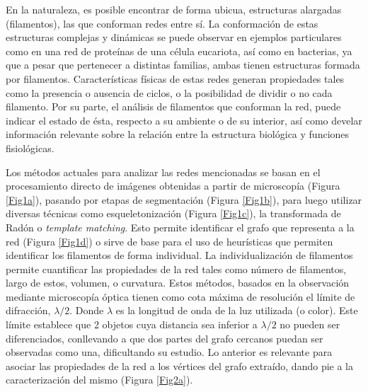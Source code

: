\begin{intro}
\label{intro}

En la naturaleza, es posible encontrar de forma ubicua, estructuras alargadas (filamentos), las que conforman redes entre sí. La conformación de estas estructuras complejas y din\'amicas se puede observar en ejemplos particulares como en una red de prote\'inas de una c\'elula eucariota, as\'i como en bacterias, ya que a pesar que pertenecer a distintas familias, ambas tienen estructuras formada por filamentos. 
Caracter\'isticas f\'isicas de estas redes generan propiedades tales como la presencia o ausencia de ciclos, o la posibilidad de dividir o no cada filamento. Por su parte, el análisis de filamentos que conforman la red, puede indicar el estado de \'esta, respecto a su ambiente o de su interior, as\'i como develar informaci\'on relevante sobre la relaci\'on entre la estructura biol\'ogica y funciones fisiol\'ogicas.  
  
Los m\'etodos actuales para analizar las redes mencionadas se basan en el procesamiento directo de im\'agenes obtenidas a partir de microscop\'ia (Figura \ref{Fig1a}), pasando por etapas de segmentaci\'on (Figura \ref{Fig1b}), para luego utilizar diversas t\'ecnicas como esqueletonizaci\'on (Figura \ref{Fig1c}), la transformada de Rad\'on o {\it template matching}. Esto permite identificar el grafo que representa a la red (Figura \ref{Fig1d}) o sirve de base para el uso de heur\'isticas que permiten identificar los filamentos de forma individual.
La individualizaci\'on de filamentos permite cuantificar las propiedades de la red tales como n\'umero de filamentos, largo de estos, volumen, o curvatura. Estos m\'etodos, basados en la observaci\'on mediante microscop\'ia \'optica tienen como cota m\'axima de resoluci\'on el l\'imite de difracci\'on, $\lambda/2$. Donde $\lambda$ es la longitud de onda de la luz utilizada (o color). Este l\'imite establece que 2 objetos cuya distancia sea inferior a $\lambda/2$ no pueden ser diferenciados, conllevando a que dos partes del grafo cercanos puedan ser observadas como una, dificultando su estudio. Lo anterior es relevante para asociar las propiedades de la red a los v\'ertices del grafo extra\'ido, dando pie a la caracterizaci\'on del mismo (Figura \ref{Fig2a}).
 

\end{intro}
